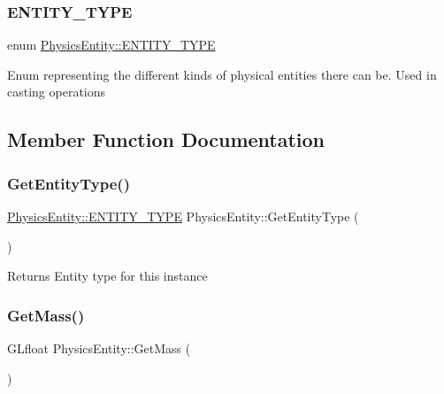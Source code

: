 \subsubsection{\texorpdfstring{E\+N\+T\+I\+T\+Y\+\_\+\+T\+Y\+PE}{ENTITY\_TYPE}}
{\footnotesize\ttfamily enum \hyperlink{classPhysicsEntity_a171840d3fef1fc21c3f922b240e03538}{Physics\+Entity\+::\+E\+N\+T\+I\+T\+Y\+\_\+\+T\+Y\+PE}\hspace{0.3cm}{\ttfamily [strong]}}

Enum representing the different kinds of physical entities there can be. Used in casting operations 

\subsection{Member Function Documentation}
\mbox{\label{classPhysicsEntity_a5a1eb68e1ecb2d845959addbbc915577}} 
\subsubsection{\texorpdfstring{Get\+Entity\+Type()}{GetEntityType()}}
{\footnotesize\ttfamily \hyperlink{classPhysicsEntity_a171840d3fef1fc21c3f922b240e03538}{Physics\+Entity\+::\+E\+N\+T\+I\+T\+Y\+\_\+\+T\+Y\+PE} Physics\+Entity\+::\+Get\+Entity\+Type (\begin{DoxyParamCaption}{ }\end{DoxyParamCaption})}

\begin{DoxyReturn}{Returns}
Entity type for this instance 
\end{DoxyReturn}
\mbox{\label{classPhysicsEntity_a07943c4b81878d402b97d1280f8c8ff9}} 
\subsubsection{\texorpdfstring{Get\+Mass()}{GetMass()}}
{\footnotesize\ttfamily G\+Lfloat Physics\+Entity\+::\+Get\+Mass (\begin{DoxyParamCaption}{ }\end{DoxyParamCaption})}

